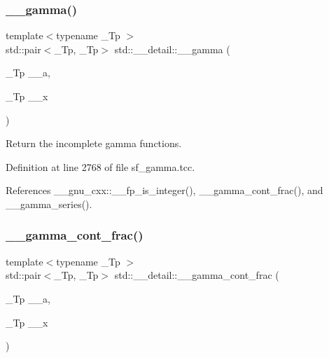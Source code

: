 \mbox{\label{namespacestd_1_1____detail_a00ade496acee116fb7990d20ff4be762}} 
\subsubsection{\texorpdfstring{\+\_\+\+\_\+gamma()}{\_\_gamma()}\hspace{0.1cm}{\footnotesize\ttfamily [2/2]}}
{\footnotesize\ttfamily template$<$typename \+\_\+\+Tp $>$ \\
std\+::pair$<$\+\_\+\+Tp, \+\_\+\+Tp$>$ std\+::\+\_\+\+\_\+detail\+::\+\_\+\+\_\+gamma (\begin{DoxyParamCaption}\item[{\+\_\+\+Tp}]{\+\_\+\+\_\+a,  }\item[{\+\_\+\+Tp}]{\+\_\+\+\_\+x }\end{DoxyParamCaption})}



Return the incomplete gamma functions. 



Definition at line 2768 of file sf\+\_\+gamma.\+tcc.



References \+\_\+\+\_\+gnu\+\_\+cxx\+::\+\_\+\+\_\+fp\+\_\+is\+\_\+integer(), \+\_\+\+\_\+gamma\+\_\+cont\+\_\+frac(), and \+\_\+\+\_\+gamma\+\_\+series().

\mbox{\label{namespacestd_1_1____detail_afd6319747af991947a02388acee40c26}} 
\subsubsection{\texorpdfstring{\+\_\+\+\_\+gamma\+\_\+cont\+\_\+frac()}{\_\_gamma\_cont\_frac()}}
{\footnotesize\ttfamily template$<$typename \+\_\+\+Tp $>$ \\
std\+::pair$<$\+\_\+\+Tp, \+\_\+\+Tp$>$ std\+::\+\_\+\+\_\+detail\+::\+\_\+\+\_\+gamma\+\_\+cont\+\_\+frac (\begin{DoxyParamCaption}\item[{\+\_\+\+Tp}]{\+\_\+\+\_\+a,  }\item[{\+\_\+\+Tp}]{\+\_\+\+\_\+x }\end{DoxyParamCaption})}



